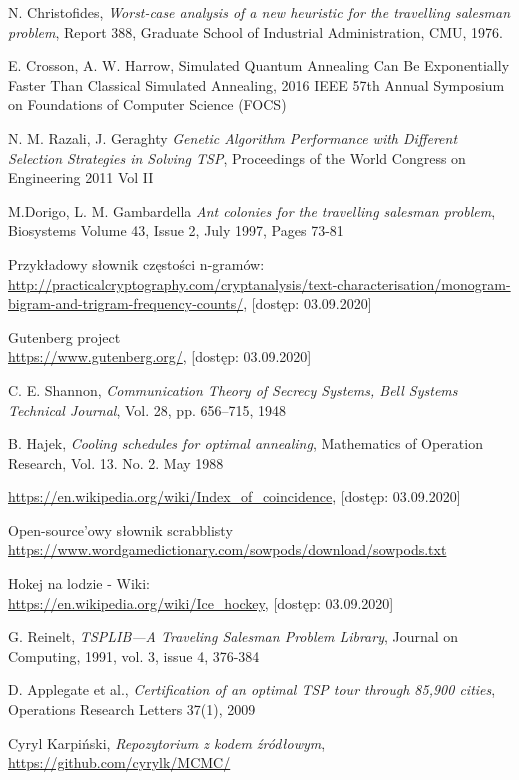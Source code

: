 \documentclass[a4paper]{article}
\theoremstyle{defn}
\theoremstyle{theorem}
\theoremstyle{lemma}
\theoremstyle{cor}
\theoremstyle{fact}
\begin{document}
\begin{thebibliography}{9}
  N. Christofides, \emph{Worst-case analysis of a new heuristic for the travelling salesman problem}, Report 388, Graduate School of Industrial Administration, CMU, 1976.

E. Crosson, A. W. Harrow, {Simulated Quantum Annealing Can Be Exponentially Faster Than Classical Simulated Annealing},
2016 IEEE 57th Annual Symposium on Foundations of Computer Science (FOCS)


N. M. Razali, J. Geraghty \emph{Genetic Algorithm Performance with Different
Selection Strategies in Solving TSP},
Proceedings of the World Congress on Engineering 2011 Vol II

M.Dorigo, L. M. Gambardella \emph{Ant colonies for the travelling salesman problem}, Biosystems
Volume 43, Issue 2, July 1997, Pages 73-81


Przykładowy słownik częstości n-gramów:\\
\href{http://practicalcryptography.com/cryptanalysis/text-characterisation/monogram-bigram-and-trigram-frequency-counts/}{http://practicalcryptography.com/cryptanalysis/text-characterisation/monogram-bigram-and-trigram-frequency-counts/}, [dostęp: 03.09.2020]

Gutenberg project\\
\href{https://www.gutenberg.org/}{https://www.gutenberg.org/}, [dostęp: 03.09.2020]

C. E. Shannon, \emph{Communication Theory of Secrecy Systems, Bell Systems Technical Journal}, Vol. 28, pp. 656–715, 1948

B. Hajek, \emph{Cooling schedules for optimal annealing},
Mathematics of Operation Research, Vol. 13. No. 2. May 1988

\href{https://en.wikipedia.org/wiki/Index\_of\_coincidence}{https://en.wikipedia.org/wiki/Index\_of\_coincidence}, [dostęp: 03.09.2020]

Open-source'owy słownik scrabblisty\\
\href{https://www.wordgamedictionary.com/sowpods/download/sowpods.txt}{https://www.wordgamedictionary.com/sowpods/download/sowpods.txt}

Hokej na lodzie - Wiki:\\
\href{https://en.wikipedia.org/wiki/Ice\_hockey}{https://en.wikipedia.org/wiki/Ice\_hockey}, [dostęp: 03.09.2020]

G. Reinelt, \emph{TSPLIB—A Traveling Salesman Problem Library}, Journal on Computing, 1991, vol. 3, issue 4, 376-384

D. Applegate  et al.,  \emph{Certification of an optimal TSP tour through 85,900 cities}, Operations Research Letters 37(1), 2009

Cyryl Karpiński,
\textit{Repozytorium z kodem źródłowym},
\href{https://github.com/cyrylk/MCMC/}{https://github.com/cyrylk/MCMC/}

\end{thebibliography}
\end{document}
